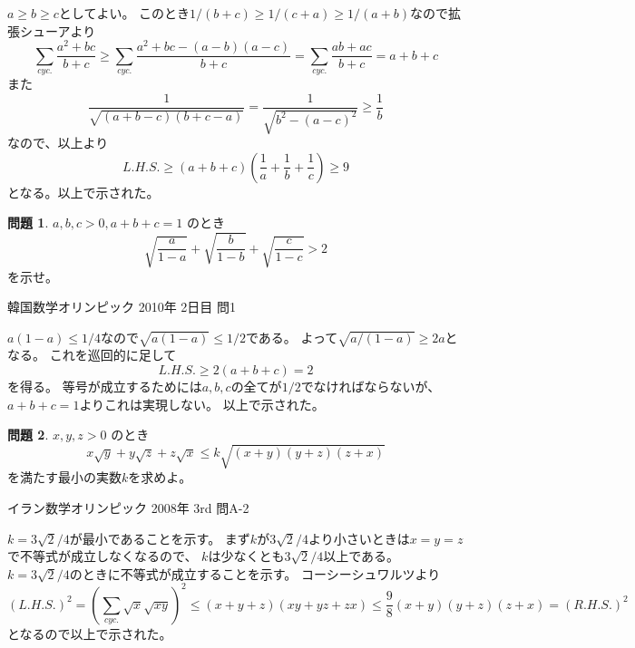 \documentclass[uplatex, a5paper]{jsarticle}
\makeatletter
\theoremstyle{definition}
\newtheorem{prob}{問題}
\renewenvironment{proof}[1][\proofname]{
  \pushQED{\qed}%
  \normalfont \topsep6\p@\@plus6\p@\relax
  \trivlist
  \item[\hskip\labelsep
    #1\@addpunct{\textbf{.}}]\ignorespaces
}{%
  \popQED\endtrivlist\@endpefalse
}
\providecommand{\proofname}{証明}
\newcommand{\lhs }{ L.H.S. }
\newcommand{\rhs }{ R.H.S. }
\def\qed{\hfill $\Box$}
\makeatother
\begin{document}
\begin{proof}
  \(a\geq b \geq c\)としてよい。
  このとき\(1/(b+c)\geq 1/(c+a) \geq 1/(a+b)\)なので拡張シューアより
  \[
  \sum_{cyc.}\frac{a^2+bc}{b+c}
  \geq \sum_{cyc.}\frac{a^2+bc - (a-b)(a-c)}{b+c}
  = \sum_{cyc.}\frac{ab+ac}{b+c}
  = a+b+c
  \]
  また
  \[
  \frac{1}{\sqrt{(a+b-c)(b+c-a)}} = \frac{1}{\sqrt{b^2-(a-c)^2}} \geq \frac{1}{b}
  \]
  なので、以上より
  \[
  \lhs \geq (a+b+c)\left( \frac{1}{a} + \frac{1}{b} + \frac{1}{c} \right)
  \geq 9
  \]
  となる。以上で示された。
\end{proof}











\newpage


\begin{prob}
\(a , b , c > 0 , a+b+c = 1\)
のとき
\[
\sqrt{\frac{a}{1-a}} + \sqrt{\frac{b}{1-b}} + \sqrt{\frac{c}{1-c}} > 2
\]
を示せ。
\begin{flushright}
  韓国数学オリンピック 2010年 2日目 問1
\end{flushright}
\end{prob}


\begin{proof}
  \(a(1-a) \leq 1/4\)なので\(\sqrt{a(1-a)}\leq 1/2\)である。
  よって\(\sqrt{a/(1-a)} \geq 2a\)となる。
  これを巡回的に足して
  \[
  \lhs \geq 2(a+b+c) = 2
  \]
  を得る。
  等号が成立するためには\(a,b,c\)の全てが\(1/2\)でなければならないが、
  \(a+b+c=1\)よりこれは実現しない。
  以上で示された。
\end{proof}










\newpage

\begin{prob}
  \(x,y,z>0\)
  のとき
  \[
  x\sqrt{y} + y\sqrt{z} + z\sqrt{x} \leq k\sqrt{(x+y)(y+z)(z+x)}
  \]
  を満たす最小の実数\(k\)を求めよ。
  \begin{flushright}
    イラン数学オリンピック 2008年 3rd 問A-2
  \end{flushright}
\end{prob}


\begin{proof}
  \(k = 3\sqrt{2}/4\)が最小であることを示す。
  まず\(k\)が\(3\sqrt{2}/4\)より小さいときは\(x=y=z\)で不等式が成立しなくなるので、
  \(k\)は少なくとも\(3\sqrt{2}/4\)以上である。
  \(k=3\sqrt{2}/4\)のときに不等式が成立することを示す。
  コーシーシュワルツより
  \[
  ( \lhs )^2 = \left( \sum_{cyc.}\sqrt{x}\sqrt{xy} \right) ^2
  \leq (x+y+z)(xy+yz+zx)
  \leq \frac{9}{8}(x+y)(y+z)(z+x) = ( \rhs )^2
  \]
  となるので以上で示された。
\end{proof}
\end{document}
